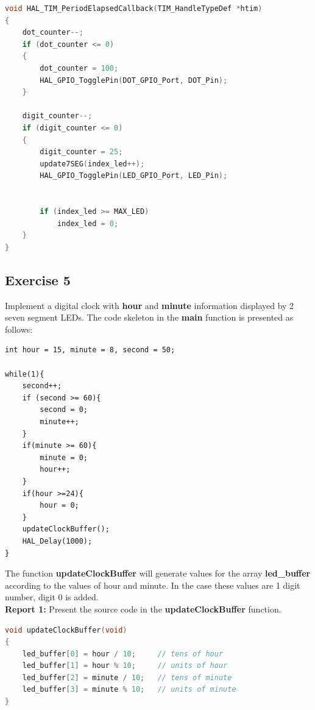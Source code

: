 \begin{lstlisting}[language=c,caption={Source code in the HAL\_TIM\_PeriodElapsedCallback function.}]
void HAL_TIM_PeriodElapsedCallback(TIM_HandleTypeDef *htim)
{
    dot_counter--;
    if (dot_counter <= 0)
    {
        dot_counter = 100;
        HAL_GPIO_TogglePin(DOT_GPIO_Port, DOT_Pin);
    }

    digit_counter--;
    if (digit_counter <= 0)
    {
        digit_counter = 25;
        update7SEG(index_led++);
        HAL_GPIO_TogglePin(LED_GPIO_Port, LED_Pin);


        if (index_led >= MAX_LED)
            index_led = 0;
    }
}
\end{lstlisting}










\subsection{Exercise 5}
Implement a digital clock with \textbf{hour} and \textbf {minute} information displayed by 2 seven segment LEDs. The code skeleton in the \textbf{main} function is presented as follows:
\begin{lstlisting}[caption=An example for your source code]
int hour = 15, minute = 8, second = 50;

while(1){
    second++;
    if (second >= 60){
        second = 0;
        minute++;
    }
    if(minute >= 60){
        minute = 0;
        hour++;
    }
    if(hour >=24){
        hour = 0;
    }
    updateClockBuffer();
    HAL_Delay(1000);
}
\end{lstlisting}

The function \textbf{updateClockBuffer} will generate values for the array \textbf{led\_buffer} according to the values of hour and minute. In the case these values are 1 digit number, digit 0 is added. \\

\textbf{Report 1: } Present the source code in the \textbf{updateClockBuffer} function.

\begin{lstlisting}[language=c,caption={Source code in the updateClockBuffer function.}]
void updateClockBuffer(void)
{
    led_buffer[0] = hour / 10;     // tens of hour
    led_buffer[1] = hour % 10;     // units of hour
    led_buffer[2] = minute / 10;   // tens of minute
    led_buffer[3] = minute % 10;   // units of minute
}
\end{lstlisting}








